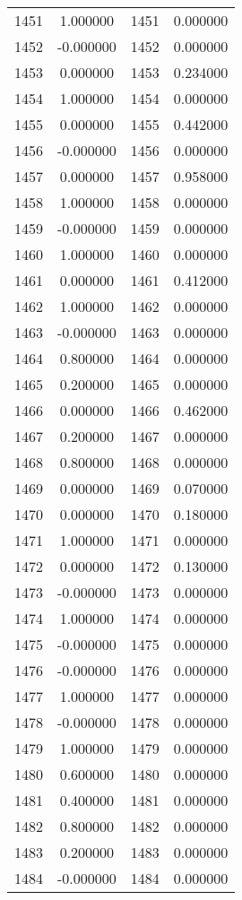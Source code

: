 \documentclass[12pt]{article}
\begin{document}
\begin{longtable}{@{}cccc@{}}
1451 & 1.000000 & 1451 & 0.000000 \\
1452 & -0.000000 & 1452 & 0.000000 \\
1453 & 0.000000 & 1453 & 0.234000 \\
1454 & 1.000000 & 1454 & 0.000000 \\
1455 & 0.000000 & 1455 & 0.442000 \\
1456 & -0.000000 & 1456 & 0.000000 \\
1457 & 0.000000 & 1457 & 0.958000 \\
1458 & 1.000000 & 1458 & 0.000000 \\
1459 & -0.000000 & 1459 & 0.000000 \\
1460 & 1.000000 & 1460 & 0.000000 \\
1461 & 0.000000 & 1461 & 0.412000 \\
1462 & 1.000000 & 1462 & 0.000000 \\
1463 & -0.000000 & 1463 & 0.000000 \\
1464 & 0.800000 & 1464 & 0.000000 \\
1465 & 0.200000 & 1465 & 0.000000 \\
1466 & 0.000000 & 1466 & 0.462000 \\
1467 & 0.200000 & 1467 & 0.000000 \\
1468 & 0.800000 & 1468 & 0.000000 \\
1469 & 0.000000 & 1469 & 0.070000 \\
1470 & 0.000000 & 1470 & 0.180000 \\
1471 & 1.000000 & 1471 & 0.000000 \\
1472 & 0.000000 & 1472 & 0.130000 \\
1473 & -0.000000 & 1473 & 0.000000 \\
1474 & 1.000000 & 1474 & 0.000000 \\
1475 & -0.000000 & 1475 & 0.000000 \\
1476 & -0.000000 & 1476 & 0.000000 \\
1477 & 1.000000 & 1477 & 0.000000 \\
1478 & -0.000000 & 1478 & 0.000000 \\
1479 & 1.000000 & 1479 & 0.000000 \\
1480 & 0.600000 & 1480 & 0.000000 \\
1481 & 0.400000 & 1481 & 0.000000 \\
1482 & 0.800000 & 1482 & 0.000000 \\
1483 & 0.200000 & 1483 & 0.000000 \\
1484 & -0.000000 & 1484 & 0.000000 \\

\end{longtable}
\end{document}
